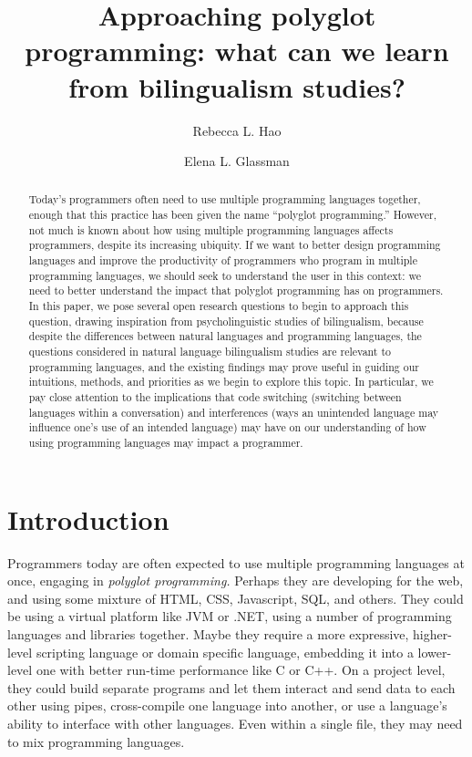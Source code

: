 \documentclass[a4paper,UKenglish,cleveref, autoref]{oasics-v2019}
\title{Approaching polyglot programming: what can we learn from bilingualism studies?}
\author{Rebecca L. Hao}{Department of Computer Science and Department of Linguistics, Harvard University, USA}{rhao@college.harvard.edu}{https://orcid.org/0000-0002-1310-2327}{}%
\author{Elena L. Glassman}{Department of Computer Science, Harvard University, USA}{glassman@seas.harvard.edu}{https://orcid.org/0000-0001-5178-3496}{}
\begin{document}
\maketitle

\begin{abstract}
Today's programmers often need to use multiple programming languages together, enough that this practice has been given the name ``polyglot programming.'' However, not much is known about how using multiple programming languages affects programmers, despite its increasing ubiquity. If we want to better design programming languages and improve the productivity of programmers who program in multiple programming languages, we should seek to understand the user in this context: we need to better understand the impact that polyglot programming has on programmers. In this paper, we pose several open research questions to begin to approach this question, drawing inspiration from psycholinguistic studies of bilingualism, because despite the differences between natural languages and programming languages, the questions considered in natural language bilingualism studies are relevant to programming languages, and the existing findings may prove useful in guiding our intuitions, methods, and priorities as we begin to explore this topic. In particular, we pay close attention to the implications that code switching (switching between languages within a conversation) and interferences (ways an unintended language may influence one's use of an intended language) may have on our understanding of how using programming languages may impact a programmer. 
\end{abstract}

\section{Introduction}
\label{sec:typesetting-summary}


Programmers today are often expected to use multiple programming languages at once, engaging in \textit{polyglot programming.} Perhaps they are developing for the web, and using some mixture of HTML, CSS, Javascript, SQL, and others. They could be using a virtual platform like JVM or .NET, using a number of programming languages and libraries together. Maybe they require a more expressive, higher-level scripting language or domain specific language, embedding it into a lower-level one with better run-time performance like C or C++. On a project level, they could build separate programs and let them interact and send data to each other using pipes, cross-compile one language into another, or use a language’s ability to interface with other languages. Even within a single file, they may need to mix programming languages. 
\end{document}
